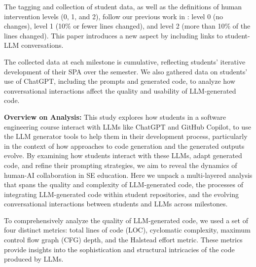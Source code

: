The tagging and collection of student data, as well as the definitions of human intervention levels (0, 1, and 2), follow our previous work in \cite{Rasnayaka2024}: level 0 (no changes), level 1 (10\% or fewer lines changed), and level 2 (more than 10\% of the lines changed). This paper introduces a new aspect by including links to student-LLM conversations.


The collected data at each milestone is cumulative, reflecting students' iterative development of their SPA over the semester. We also gathered data on students' use of ChatGPT, including the prompts and generated code, to analyze how conversational interactions affect the quality and usability of LLM-generated code.

\textbf{Overview on Analysis:}
This study explores how students in a software engineering course interact with LLMs like ChatGPT and GitHub Copilot, to use the LLM generator tools to help them in their development process, particularly in the context of how approaches to code generation and the generated outputs evolve. By examining how students interact with these LLMs, adapt generated code, and refine their prompting strategies, we aim to reveal the dynamics of human-AI collaboration in SE education. Here we unpack a multi-layered analysis that spans the quality and complexity of LLM-generated code, the processes of integrating LLM-generated code within student repositories, and the evolving conversational interactions between students and LLMs across milestones.

To comprehensively analyze the quality of LLM-generated code, we used a set of four distinct metrics: total lines of code (LOC), cyclomatic complexity, maximum control flow graph (CFG) depth, and the Halstead effort metric. These metrics provide insights into the sophistication and structural intricacies of the code produced by LLMs. 

